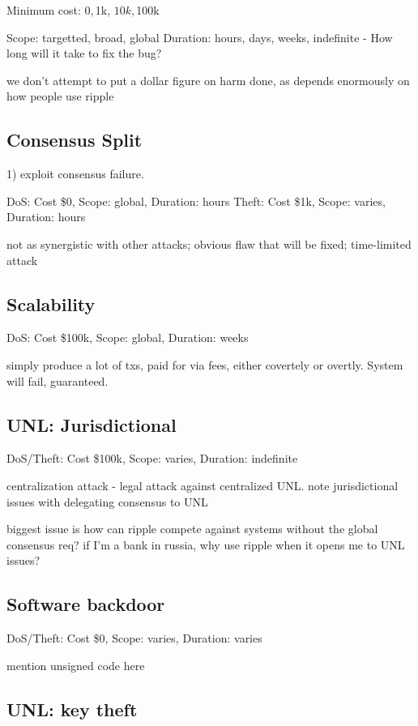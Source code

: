 \documentclass{article}
\begin{document}
Minimum cost: $0, $1k, $10k, $100k

Scope: targetted, broad, global
Duration: hours, days, weeks, indefinite - How long will it take to fix the bug?

we don't attempt to put a dollar figure on harm done, as depends enormously on
how people use ripple


\subsection{Consensus Split}

1) exploit consensus failure.

DoS: Cost \$0, Scope: global, Duration: hours
Theft: Cost \$1k, Scope: varies, Duration: hours

not as synergistic with other attacks; obvious flaw that will be fixed;
time-limited attack


\subsection{Scalability}

DoS: Cost \$100k, Scope: global, Duration: weeks

simply produce a lot of txs, paid for via fees, either covertely or overtly.
System will fail, guaranteed.


\subsection{UNL: Jurisdictional}

DoS/Theft: Cost \$100k, Scope: varies, Duration: indefinite

centralization attack - legal attack against centralized UNL. note
jurisdictional issues with delegating consensus to UNL

biggest issue is how can ripple compete against systems without the global
consensus req? if I'm a bank in russia, why use ripple when it opens me to UNL
issues?


\subsection{Software backdoor}

DoS/Theft: Cost \$0, Scope: varies, Duration: varies

mention unsigned code here


\subsection{UNL: key theft}
\end{document}
